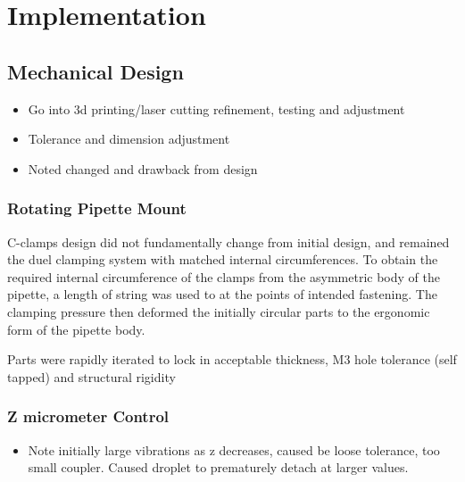 \chapter{Implementation}\label{C:imp}

\section{Mechanical Design}

\begin{itemize}
    \item Go into 3d printing/laser cutting refinement, testing and adjustment
    \item Tolerance and dimension adjustment
    \item Noted changed and drawback from design
\end{itemize}

\subsection{Rotating Pipette Mount}

C-clamps design did not fundamentally change from initial design, and remained the duel clamping system with matched internal circumferences. To obtain the required internal circumference of the clamps from the asymmetric body of the pipette, a length of string was used to at the points of intended fastening. The clamping pressure then deformed the initially circular parts to the ergonomic form of the pipette body.

Parts were rapidly iterated to lock in acceptable thickness, M3 hole tolerance (self tapped) and structural rigidity 

\subsection{Z micrometer Control}
\begin{itemize}
    \item Note initially large vibrations as z decreases, caused be loose tolerance, too small coupler. Caused droplet to prematurely detach at larger values.
\end{itemize}


